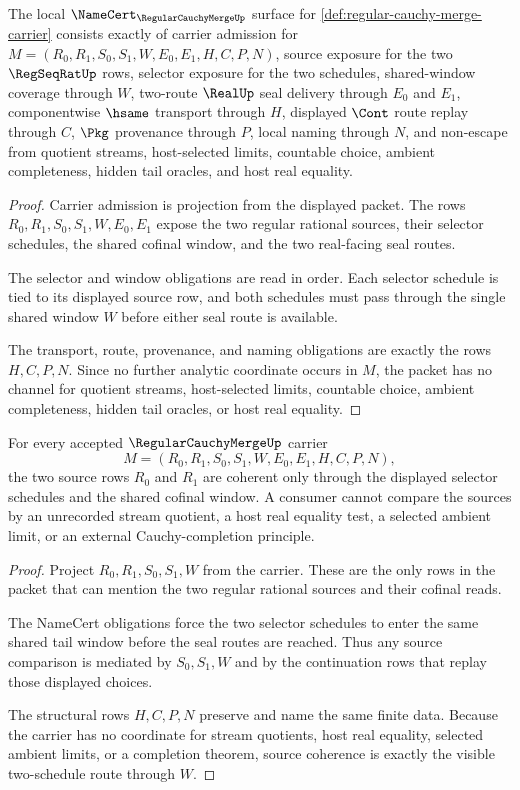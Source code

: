 \begin{theorem}
\label{thm:regular-cauchy-merge-namecert-obligations}
The local $\NameCert_{\RegularCauchyMergeUp}$ surface for \autoref{def:regular-cauchy-merge-carrier} consists exactly of carrier admission for $M=(R_0,R_1,S_0,S_1,W,E_0,E_1,H,C,P,N)$, source exposure for the two $\RegSeqRatUp$ rows, selector exposure for the two schedules, shared-window coverage through $W$, two-route $\RealUp$ seal delivery through $E_0$ and $E_1$, componentwise $\hsame$ transport through $H$, displayed $\Cont$ route replay through $C$, $\Pkg$ provenance through $P$, local naming through $N$, and non-escape from quotient streams, host-selected limits, countable choice, ambient completeness, hidden tail oracles, and host real equality.
\end{theorem}
\begin{proof}
Carrier admission is projection from the displayed packet. The rows $R_0,R_1,S_0,S_1,W,E_0,E_1$ expose the two regular rational sources, their selector schedules, the shared cofinal window, and the two real-facing seal routes.

The selector and window obligations are read in order. Each selector schedule is tied to its displayed source row, and both schedules must pass through the single shared window $W$ before either seal route is available.

The transport, route, provenance, and naming obligations are exactly the rows $H,C,P,N$. Since no further analytic coordinate occurs in $M$, the packet has no channel for quotient streams, host-selected limits, countable choice, ambient completeness, hidden tail oracles, or host real equality.
\end{proof}

\begin{theorem}
\label{thm:regular-cauchy-merge-source-coherence}
For every accepted $\RegularCauchyMergeUp$ carrier
$$
M=(R_0,R_1,S_0,S_1,W,E_0,E_1,H,C,P,N),
$$
the two source rows $R_0$ and $R_1$ are coherent only through the displayed selector schedules and the shared cofinal window. A consumer cannot compare the sources by an unrecorded stream quotient, a host real equality test, a selected ambient limit, or an external Cauchy-completion principle.
\end{theorem}
\begin{proof}
Project $R_0,R_1,S_0,S_1,W$ from the carrier. These are the only rows in the packet that can mention the two regular rational sources and their cofinal reads.

The NameCert obligations force the two selector schedules to enter the same shared tail window before the seal routes are reached. Thus any source comparison is mediated by $S_0,S_1,W$ and by the continuation rows that replay those displayed choices.

The structural rows $H,C,P,N$ preserve and name the same finite data. Because the carrier has no coordinate for stream quotients, host real equality, selected ambient limits, or a completion theorem, source coherence is exactly the visible two-schedule route through $W$.
\end{proof}

